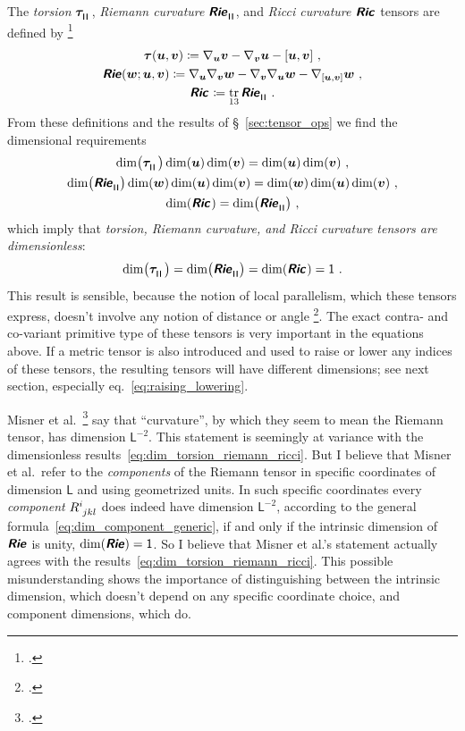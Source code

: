 \documentclass[\ifafour a4paper,12pt,\else a5paper,10pt,\fi%
onecolumn,oneside,article,%
british%
]{memoir}
\makeatletter
\theoremstyle{remark}
\theoremstyle{innote}
\newcommand*{\mathte}[1]{\textbf{\textit{\textsf{#1}}}}
\newcommand*{\citep}{\footcites}
\DeclareMathOperator{\tr}{tr}%
\newcommand*{\defd}{\coloneqq}
\DeclarePairedDelimiter\clcl{[}{]}
\renewcommand*{\|}[1][]{\nonscript\,#1\vert\nonscript\;\mathopen{}}
\newcommand*{\sect}{\S}%
\newcommand*{\eqn}{eq.}%
\newcommand*{\cf}{{cf.}}
\newcommand*{\etal}{{et al.}}
\newcommand*{\q}{}%
\DeclareRobustCommand*{\q}{%
  \mathbin{\mathpalette\bigcdot@{}}%
}
\newcommand*{\bigcdot@scalefactor}{0.7}
\newcommand*{\bigcdot@widthfactor}{1.5}
\newcommand*{\bigcdot@}[2]{%
  \sbox0{$#1\vcenter{}$}%
  \sbox2{$#1\cdot\m@th$}%
  \hbox to \bigcdot@widthfactor\wd2{%
    \hfil
    \raise\ht0\hbox{%
      \scalebox{\bigcdot@scalefactor}{%
        \lower\ht0\hbox{$#1\bullet\m@th$}%
      }%
    }%
    \hfil
  }%
}
\newcommand*{\Un}{\textsf{1}}
\newcommand*{\Le}{\textsf{L}}
\newcommand*{\yR}{\mathte{Rie}}
\newcommand*{\yRi}{\mathte{Ric}}
\newcommand*{\yTo}{\bm{\tau}}
\newcommand*{\yv}{\bm{v}}
\newcommand*{\yu}{\bm{u}}
\newcommand*{\yw}{\bm{w}}
\renewcommand*{\i}{\indices}
\newcommand*{\nab}{\nabla}
\newcommand*{\rul}{{\mkern2mu\rule[-0.1ex]{0.75pt}{1.1ex}\mkern2mu}}
\DeclarePairedDelimiter\mul{\rul}{\rul}%
\makeatother
\begin{document}
The \emph{torsion} $\yTo\i{^{\q}_{\mul{\q\q}}}$, \emph{Riemann
  curvature} $\yR\i{^{\q}_{\q\mul{\q\q}}}$, and \emph{Ricci
  curvature} $\yRi\i{_{\q\q}}$ tensors are defined by
\citep[\sect~V.B.1]{choquetbruhatetal1977_r1996}
\begin{gather}
  \label{eq:torsion_eq}
\yTo(\yu,\yv) \defd \nab_{\yu}\yv - \nab_{\yv}\yu - \clcl{\yu,\yv}\ ,
\\
\yR(\yw;\yu,\yv) \defd
\nab_{\yu}\nab_{\yv}\yw - \nab_{\yv}\nab_{\yu}\yw
- \nab_{\clcl{\yu,\yv}}\yw\ ,
  \label{eq:riemann_eq}  
\\
\yRi\i{_{\q\q}} \defd \tr_{13} \yR\i{^{\q}_{\q\mul{\q\q}}} \ .
  \label{eq:ricci_eq}  
\end{gather}
From these definitions and the results of \sect~\ref{sec:tensor_ops} we
find the dimensional requirements
\begin{gather}
  \label{eq:torsion_eq_dim}
\dim\bigl(\yTo\i{^{\q}_{\mul{\q\q}}}\bigr)\dim(\yu)\dim(\yv) = \dim(\yu) \dim(\yv)\ ,
\\
\dim\bigl(\yR\i{^{\q}_{\q\mul{\q\q}}}\bigr)\dim(\yw)\dim(\yu)\dim(\yv) =
\dim(\yw)\dim(\yu)\dim(\yv)\ ,
\label{eq:riemann_eq_dim}
\\
\dim(\yRi\i{_{\q\q}}) = \dim\bigl(\yR\i{^{\q}_{\q\mul{\q\q}}}\bigr)\ ,
  \label{eq:ricci_eq_dim}  
\end{gather}
which imply that \emph{torsion, Riemann curvature, and Ricci curvature
  tensors are dimensionless}:
\begin{equation}
  \label{eq:dim_torsion_riemann_ricci}
  \dim\bigl(\yTo\i{^{\q}_{\mul{\q\q}}}\bigr) =
   \dim\bigl(\yR\i{^{\q}_{\q\mul{\q\q}}}\bigr) =
   \dim(\yRi\i{_{\q\q}}) =\Un\ .
\end{equation}
This result is sensible, because the notion of local parallelism, which
these tensors express, doesn't involve any notion of distance or angle
\citep[\cf][]{portamana2011_r2019}. The exact contra- and co-variant
primitive type of these tensors is very important in the equations above.
If a metric tensor is also introduced and used to raise or lower any
indices of these tensors, the resulting tensors will have different
dimensions; see next section, especially \eqn~\eqref{eq:raising_lowering}.

Misner \etal\ \citep[p.~35%
]{misneretal1970_r1973} say that \enquote{curvature}, by which they seem to
mean the Riemann tensor, has dimension $\Le^{-2}$. This statement is
seemingly at variance with the dimensionless
results~\eqref{eq:dim_torsion_riemann_ricci}. But I believe that Misner
\etal\ refer to the \emph{components} of the Riemann tensor in specific
coordinates of dimension $\Le$ and using geometrized units. In such
specific coordinates every \emph{component} $R\i{^{i}_{jkl}}$ does indeed
have dimension $\Le^{-2}$, according to the general
formula~\eqref{eq:dim_component_generic}, if and only if the intrinsic
dimension of $\yR$ is unity, $\dim(\yR)=\Un$. So I believe that Misner
\etal's statement actually agrees with the
results~\eqref{eq:dim_torsion_riemann_ricci}. This possible
misunderstanding shows the importance of distinguishing between the
intrinsic dimension, which doesn't depend on any specific coordinate
choice, and component dimensions, which do.
\end{document}

